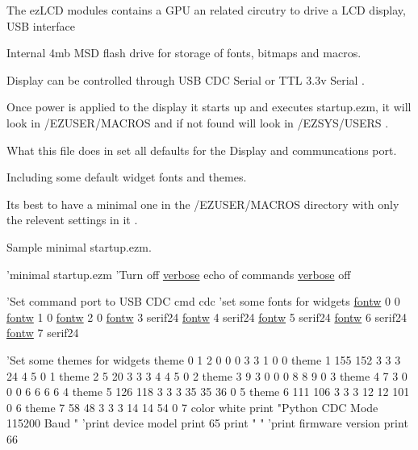 The ez\-L\-C\-D modules contains a G\-P\-U an related circutry to drive a L\-C\-D display, U\-S\-B interface \par
 Internal 4mb M\-S\-D flash drive for storage of fonts, bitmaps and macros.\par
 Display can be controlled through U\-S\-B C\-D\-C Serial or T\-T\-L 3.\-3v Serial .\par
 \par
 Once power is applied to the display it starts up and executes startup.\-ezm, it will look in /\-E\-Z\-U\-S\-E\-R/\-M\-A\-C\-R\-O\-S and if not found will look in /\-E\-Z\-S\-Y\-S/\-U\-S\-E\-R\-S .\par
 What this file does in set all defaults for the Display and communcations port.\par
 Including some default widget fonts and themes. \par
 Its best to have a minimal one in the /\-E\-Z\-U\-S\-E\-R/\-M\-A\-C\-R\-O\-S directory with only the relevent settings in it . \par
 \par
 Sample minimal startup.\-ezm. 
\begin{DoxyCodeInclude}
\textcolor{stringliteral}{'minimal startup.ezm}
\textcolor{stringliteral}{}
\textcolor{stringliteral}{'}Turn off \hyperlink{group___general_gaa497e8573c045944d589b17fd7dd36ac}{verbose} echo of commands
\hyperlink{group___general_gaa497e8573c045944d589b17fd7dd36ac}{verbose} off

\textcolor{stringliteral}{'Set command port to USB CDC}
\textcolor{stringliteral}{cmd cdc}
\textcolor{stringliteral}{}
\textcolor{stringliteral}{'}set some fonts \textcolor{keywordflow}{for} widgets
\hyperlink{group___widgets_gad527fa9cb9cda35802e26af7e1870f96}{fontw} 0 0
\hyperlink{group___widgets_gad527fa9cb9cda35802e26af7e1870f96}{fontw} 1 0
\hyperlink{group___widgets_gad527fa9cb9cda35802e26af7e1870f96}{fontw} 2 0
\hyperlink{group___widgets_gad527fa9cb9cda35802e26af7e1870f96}{fontw} 3 serif24
\hyperlink{group___widgets_gad527fa9cb9cda35802e26af7e1870f96}{fontw} 4 serif24
\hyperlink{group___widgets_gad527fa9cb9cda35802e26af7e1870f96}{fontw} 5 serif24
\hyperlink{group___widgets_gad527fa9cb9cda35802e26af7e1870f96}{fontw} 6 serif24
\hyperlink{group___widgets_gad527fa9cb9cda35802e26af7e1870f96}{fontw} 7 serif24

\textcolor{stringliteral}{'Set some themes for widgets}
\textcolor{stringliteral}{theme 0   1   2 0 0 0  3  3   1 0 0}
\textcolor{stringliteral}{theme 1 155 152 3 3 3  24  4   5 0 1}
\textcolor{stringliteral}{theme 2   5  20 3 3 3  4  4   5 0 2}
\textcolor{stringliteral}{theme 3   9   3 0 0 0  8  8   9 0 3}
\textcolor{stringliteral}{theme 4   7   3 0 0 0  6  6   6 6 4}
\textcolor{stringliteral}{theme 5 126 118 3 3 3 35 35  36 0 5}
\textcolor{stringliteral}{theme 6 111 106 3 3 3 12 12 101 0 6}
\textcolor{stringliteral}{theme 7  58  48 3 3 3 14 14  54 0 7}
\textcolor{stringliteral}{}
\textcolor{stringliteral}{color white}
\textcolor{stringliteral}{print "Python CDC Mode 115200 Baud  "}
\textcolor{stringliteral}{'}print device model
print 65
print \textcolor{stringliteral}{"  "}
\textcolor{stringliteral}{'print firmware version}
\textcolor{stringliteral}{print 66}
\end{DoxyCodeInclude}
